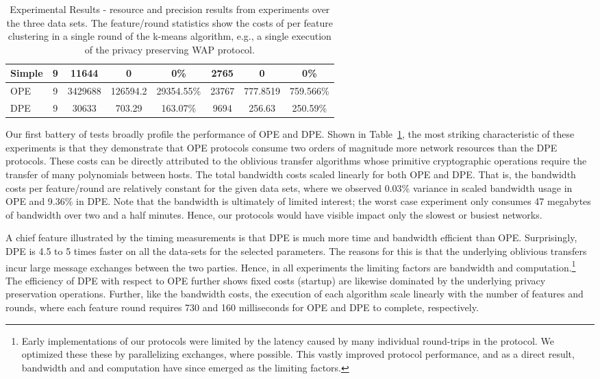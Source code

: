 \begin{table}
\begin{center}
\begin{tabular}{|l|c|c|c|c|c|c|c|}
\hline
Simple & 9 & 11644 & 0 & 0\% & 2765 & 0 & 0\% \\
\hline
OPE & 9 & 3429688 & 126594.2 & 29354.55\% & 23767 & 777.8519 &   759.566\% \\
\hline
DPE & 9 & 30633 & 703.29 & 163.07\% & 9694 & 256.63 & 250.59\% \\
\hline
\end{tabular}
\end{center}
\caption{Experimental Results - resource and precision results from
experiments over the three data sets.  The feature/round statistics
show the costs of per feature clustering in a single round of the
k-means algorithm, e.g., a single execution of the privacy preserving
WAP protocol.}
\label{tbl:results}
\end{table}

Our first battery of tests broadly profile the performance of OPE and
DPE.  Shown in Table~\ref{tbl:results}, the most striking
characteristic of these experiments is that they demonstrate that OPE
protocols consume two orders of magnitude more network resources than
the DPE protocols.  These costs can be directly attributed to the
oblivious transfer algorithms whose primitive cryptographic operations
require the transfer of many polynomials between hosts.  The total
bandwidth costs scaled linearly for both OPE and DPE.  That is, the
bandwidth costs per feature/round are relatively constant for the
given data sets, where we observed 0.03\% variance in scaled bandwidth
usage in OPE and 9.36\% in DPE.  Note that the bandwidth is ultimately
of limited interest; the worst case experiment only consumes 47
megabytes of bandwidth over two and a half minutes.  Hence, our
protocols would have visible impact only the slowest or busiest
networks.

A chief feature illustrated by the timing measurements is that DPE is
much more time and bandwidth efficient than OPE.  Surprisingly, DPE is
4.5 to 5 times faster on all the data-sets for the selected
parameters.  The reasons for this is that the underlying oblivious
transfers incur large message exchanges between the two parties.
Hence, in all experiments the limiting factors are bandwidth and
computation.\footnote{Early implementations of our protocols were
limited by the latency caused by many individual round-trips in the
protocol.  We optimized these these by parallelizing exchanges, where
possible.  This vastly improved protocol performance, and as a direct
result, bandwidth and and computation have since emerged as the
limiting factors.}  The efficiency of DPE with respect to OPE further
shows fixed costs (startup) are likewise dominated by the underlying
privacy preservation operations.  Further, like the bandwidth costs,
the execution of each algorithm scale linearly with the number of
features and rounds, where each feature round requires 730 and 160
milliseconds for OPE and DPE to complete, respectively.

